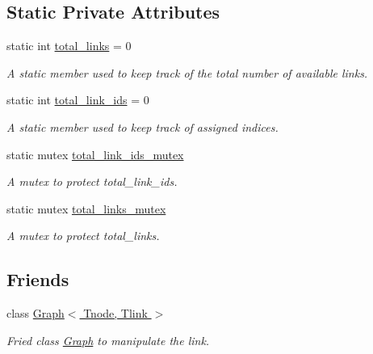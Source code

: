 \subsection*{Static Private Attributes}
\begin{DoxyCompactItemize}
\item 
static int \hyperlink{classLink_ad240a01b7643e780f7472bf5058f2151}{total\-\_\-links} = 0
\begin{DoxyCompactList}\small\item\em A static member used to keep track of the total number of available links. \end{DoxyCompactList}\item 
\hypertarget{classLink_a28f2c40cb63fc1e3538ecbc570061a27}{static int \hyperlink{classLink_a28f2c40cb63fc1e3538ecbc570061a27}{total\-\_\-link\-\_\-ids} = 0}\label{classLink_a28f2c40cb63fc1e3538ecbc570061a27}

\begin{DoxyCompactList}\small\item\em A static member used to keep track of assigned indices. \end{DoxyCompactList}\item 
\hypertarget{classLink_a23dd72433e72dd42719265fd4c7fdaf7}{static mutex \hyperlink{classLink_a23dd72433e72dd42719265fd4c7fdaf7}{total\-\_\-link\-\_\-ids\-\_\-mutex}}\label{classLink_a23dd72433e72dd42719265fd4c7fdaf7}

\begin{DoxyCompactList}\small\item\em A mutex to protect total\-\_\-link\-\_\-ids. \end{DoxyCompactList}\item 
\hypertarget{classLink_aad684c92f53d65468d758a3ae6b9eaa1}{static mutex \hyperlink{classLink_aad684c92f53d65468d758a3ae6b9eaa1}{total\-\_\-links\-\_\-mutex}}\label{classLink_aad684c92f53d65468d758a3ae6b9eaa1}

\begin{DoxyCompactList}\small\item\em A mutex to protect total\-\_\-links. \end{DoxyCompactList}\end{DoxyCompactItemize}
\subsection*{Friends}
\begin{DoxyCompactItemize}
\item 
\hypertarget{classLink_a328a8512e23864fd93de7205c56d2c3f}{class \hyperlink{classLink_a328a8512e23864fd93de7205c56d2c3f}{Graph$<$ Tnode, Tlink $>$}}\label{classLink_a328a8512e23864fd93de7205c56d2c3f}

\begin{DoxyCompactList}\small\item\em Fried class \hyperlink{classGraph}{Graph} to manipulate the link. \end{DoxyCompactList}\end{DoxyCompactItemize}


